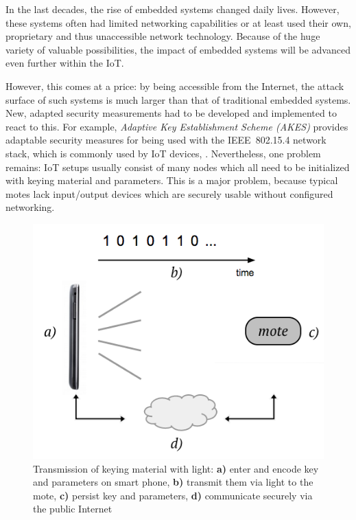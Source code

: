 \documentclass{sig-alternate} %
\begin{document}
In the last decades, the rise of embedded systems changed daily lives.
However, these systems often had limited networking capabilities or at least used their own, proprietary and thus unaccessible network technology.
Because of the huge variety of valuable possibilities, the impact of embedded systems will be advanced even further within the IoT.

However, this comes at a price: by being accessible from the Internet, the attack surface of such systems is much larger than that of traditional embedded systems.
New, adapted security measurements had to be developed and implemented to react to this.
For example, \textit{Adaptive Key Establishment Scheme (AKES)} provides adaptable security measures for being used with the IEEE~802.15.4 network stack, which is commonly used by IoT devices, \cite{krentz15akes}.
Nevertheless, one problem remains: IoT setups usually consist of many nodes which all need to be initialized with keying material and parameters.
This is a major problem, because typical motes lack input/output devices which are securely usable without configured networking.

\begin{figure}
	\centering
	\includegraphics[scale=.4]{images/overview.png}
	\caption{Transmission of keying material with light: \textbf{a)} enter and encode key and parameters on smart phone, \textbf{b)} transmit them via light to the mote, \textbf{c)} persist key and parameters, \textbf{d)} communicate securely via the public Internet }
	\label{fig:overview}
\end{figure}
\end{document}
